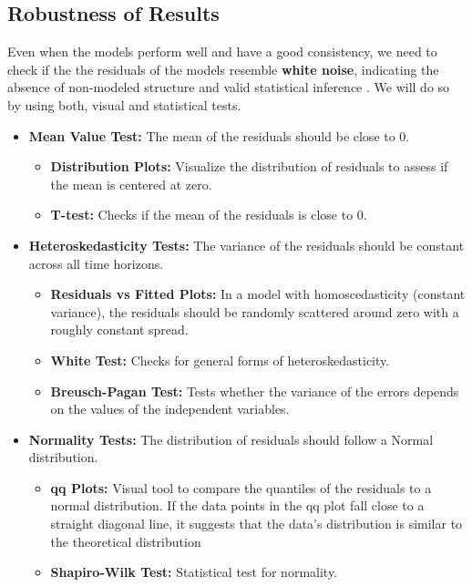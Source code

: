 \documentclass[11pt,english,a4paper,hidelinks]{book}
\begin{document}
\subsection{Robustness of Results}
Even when the models perform well and have a good consistency, we need to check if the the residuals of the models resemble \textbf{white noise}, indicating the absence of non-modeled structure and valid statistical inference \textcite{enders1948applied}. We will do so by using both, visual and statistical tests.
\begin{itemize}
    \item \textbf{Mean Value Test:} The mean of the residuals should be close to 0.
        \begin{itemize}
            \item \textbf{Distribution Plots:} Visualize the distribution of residuals to assess if the mean is centered at zero.
            \item \textbf{T-test:} Checks if the mean of the residuals is close to 0.
        \end{itemize}
    \item \textbf{Heteroskedasticity Tests:} The variance of the residuals should be constant across all time horizons.
        \begin{itemize}
            \item \textbf{Residuals vs Fitted Plots:} In a model with homoscedasticity (constant variance), the residuals should be randomly scattered around zero with a roughly constant spread.
            \item \textbf{White Test:} Checks for general forms of heteroskedasticity.
            \item \textbf{Breusch-Pagan Test:} Tests whether the variance of the errors depends on the values of the independent variables.
        \end{itemize}
    \item \textbf{Normality Tests:} The distribution of residuals should follow a Normal distribution.
        \begin{itemize}
            \item \textbf{\acrshort{qq} Plots:} Visual tool to compare the quantiles of the residuals to a normal distribution. If the data points in the \acrshort{qq} plot fall close to a straight diagonal line, it suggests that the data's distribution is similar to the theoretical distribution
            \item \textbf{Shapiro-Wilk Test:} Statistical test for normality.

\end{itemize}
\end{itemize}
\end{document}
